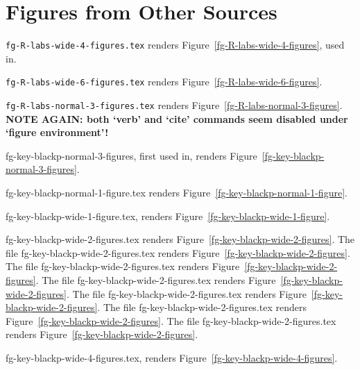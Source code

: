 %

\section{Figures from Other Sources}
\label{chap-AboutFigures-Other}

 {\tt fg-R-labs-wide-4-figures.tex}  
renders Figure~\ref{fg-R-labs-wide-4-figures}, used 
in\cite[27ex]{Lib-OPUS2-labs-2015-arxiv-Boskovic}.
\lipsum[1]



  {\tt fg-R-labs-wide-6-figures.tex}  
renders Figure~\ref{fg-R-labs-wide-6-figures}.
\lipsum[1]
\clearpage


  {\tt fg-R-labs-normal-3-figures.tex}  
renders Figure~\ref{fg-R-labs-normal-3-figures}.
{\bf NOTE AGAIN: both `verb' and `cite' commands seem disabled under `figure environment'!}
\lipsum[2]


fg-key-blackp-normal-3-figures, first used 
in\cite[27ex]{Lib-OPUS2-ebook-CSC499-Sp15-2015-Brglez},
renders Figure~\ref{fg-key-blackp-normal-3-figures}.
\lipsum[3]





fg-key-blackp-normal-1-figure.tex  
renders Figure~\ref{fg-key-blackp-normal-1-figure}.
\lipsum[4]
\lipsum[4]


\clearpage
{}
fg-key-blackp-wide-1-figure.tex, 
renders Figure~\ref{fg-key-blackp-wide-1-figure}.



\lipsum[4]

fg-key-blackp-wide-2-figures.tex  
renders Figure~\ref{fg-key-blackp-wide-2-figures}.
The file
fg-key-blackp-wide-2-figures.tex  
renders Figure~\ref{fg-key-blackp-wide-2-figures}.
The file
fg-key-blackp-wide-2-figures.tex  
renders Figure~\ref{fg-key-blackp-wide-2-figures}.
The file
fg-key-blackp-wide-2-figures.tex  
renders Figure~\ref{fg-key-blackp-wide-2-figures}.
The file
fg-key-blackp-wide-2-figures.tex  
renders Figure~\ref{fg-key-blackp-wide-2-figures}.
The file
fg-key-blackp-wide-2-figures.tex  
renders Figure~\ref{fg-key-blackp-wide-2-figures}.
The file
fg-key-blackp-wide-2-figures.tex  
renders Figure~\ref{fg-key-blackp-wide-2-figures}.

\clearpage


fg-key-blackp-wide-4-figures.tex, 
renders Figure~\ref{fg-key-blackp-wide-4-figures}.
\lipsum[4]
\lipsum[4]
